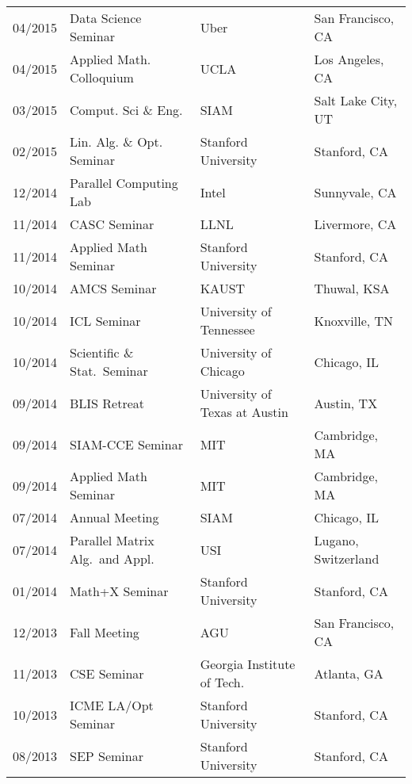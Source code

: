 \documentclass[letterpaper]{article}
\begin{document}
\begin{tabular}{rlll}
04/2015 & Data Science Seminar            & Uber                          & San Francisco, CA \\
04/2015 & Applied Math. Colloquium        & UCLA                          & Los Angeles, CA \\
03/2015 & Comput. Sci \& Eng.             & SIAM                          & Salt Lake City, UT \\
02/2015 & Lin. Alg. \& Opt. Seminar       & Stanford University           & Stanford, CA \\
12/2014 & Parallel Computing Lab          & Intel                         & Sunnyvale, CA \\
11/2014 & CASC Seminar                    & LLNL                          & Livermore, CA \\
11/2014 & Applied Math Seminar            & Stanford University           & Stanford, CA \\
10/2014 & AMCS Seminar                    & KAUST                         & Thuwal, KSA \\
10/2014 & ICL Seminar                     & University of Tennessee       & Knoxville, TN \\
10/2014 & Scientific \& Stat.\ Seminar    & University of Chicago         & Chicago, IL \\
09/2014 & BLIS Retreat                    & University of Texas at Austin & Austin, TX \\
09/2014 & SIAM-CCE Seminar                & MIT                           & Cambridge, MA \\
09/2014 & Applied Math Seminar            & MIT                           & Cambridge, MA \\
07/2014 & Annual Meeting                  & SIAM                          & Chicago, IL \\
07/2014 & Parallel Matrix Alg.\ and Appl. & USI                           & Lugano, Switzerland \\
01/2014 & Math+X Seminar                  & Stanford University           & Stanford, CA \\
12/2013 & Fall Meeting                    & AGU                           & San Francisco, CA \\
11/2013 & CSE Seminar                     & Georgia Institute of Tech.\   & Atlanta, GA \\
10/2013 & ICME LA/Opt Seminar             & Stanford University           & Stanford, CA \\
08/2013 & SEP Seminar                     & Stanford University           & Stanford, CA \\

\end{tabular}
\end{document}
